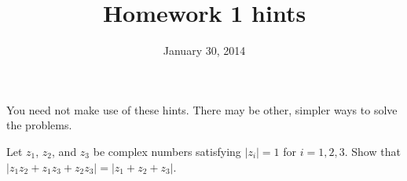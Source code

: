 
         \newcommand\alg[1]{\ensuremath{\mathbf{#1}}}
         \newcommand{\<}{\ensuremath{\langle}}
         \renewcommand{\>}{\ensuremath{\rangle}}
         \newcommand\fld[1]{\ensuremath{\mathbb{#1}}}

         \author{}
         \title{Homework 1 hints}
         \date{January 30, 2014}



\maketitle

You need not make use of these hints. There may be other, simpler ways to solve
the problems.

\begin{prob}[Golan 16]
Let $z_1$, $z_2$, and $z_3$ be complex numbers satisfying 
$|z_i| = 1$ for $i = 1, 2, 3$. Show that 
$|z_1 z_2 + z_1 z_3 + z_2 z_3 | = |z_1 + z_2 + z_3|$.
\end{prob}

